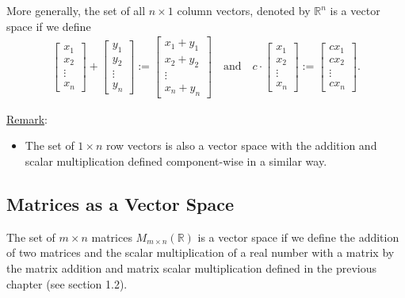 \documentclass[12pt,a4paper]{article}
\newcounter{example}[section]
\begin{document}
	\begin{example}
	More generally, the set of all $n \times 1$ column vectors, denoted by $\mathbb{R}^n$ is a vector space if we define
	\begin{align*}
		\begin{bmatrix}
		x_1 \\ x_2 \\ \vdots \\ x_n
		\end{bmatrix}
		+
		\begin{bmatrix}
		y_1 \\ y_2 \\ \vdots \\ y_n
		\end{bmatrix}
		:=
		\begin{bmatrix}
		x_1 + y_1 \\
		x_2 + y_2 \\
		\vdots \\
		x_n + y_n
		\end{bmatrix}
		\quad \text{and} \quad
		c \cdot \begin{bmatrix}
		x_1 \\ x_2 \\ \vdots \\ x_n
		\end{bmatrix}
		:= \begin{bmatrix}
		c x_1 \\ c x_2 \\ \vdots \\ c x_n
		\end{bmatrix} .
		\end{align*}
	\end{example}
	
	\vspace*{12pt}
	
	\noindent\underline{Remark}: 
	\begin{itemize}
	\item The set of $1 \times n$ row vectors is also a vector space with the addition and scalar multiplication defined component-wise in a similar way.
	\end{itemize}
	
	\newpage
	
	\subsection{Matrices as a Vector Space}
	\begin{example}
	The set of $m \times n$ matrices $M_{m \times n} (\mathbb{R})$ is a vector space if we define the addition of two matrices and the scalar multiplication of a real number with a matrix by the matrix addition and matrix scalar multiplication defined in the previous chapter (see section 1.2).
	\end{example}
	
\end{document}
